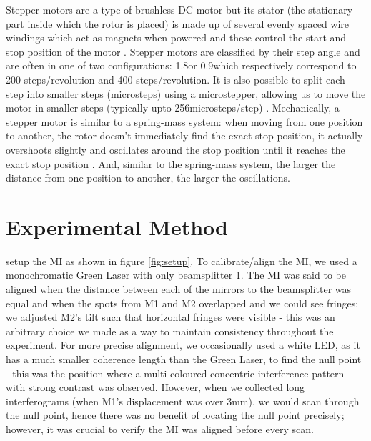 \documentclass[journal]{Imperial_lab_report}
\begin{document}
Stepper motors are a type of brushless DC motor but its stator (the stationary part inside which the rotor is placed) is made up of several evenly spaced wire windings which act as magnets when powered and these control the start and stop position of the motor \cite{motor_diff}. Stepper motors are classified by their step angle and are often in one of two configurations: 1.8\degree or 0.9\degree which respectively correspond to 200 steps/revolution and 400 steps/revolution. It is also possible to split each step into smaller steps (microsteps) using a microstepper, allowing us to move the motor in smaller steps (typically upto 256microsteps/step) \cite{microstepping}. Mechanically, a stepper motor is similar to a spring-mass system: when moving from one position to another, the rotor doesn't immediately find the exact stop position, it actually overshoots slightly and oscillates around the stop position until it reaches the exact stop position \cite{microsteppers_mech_rel}. And, similar to the spring-mass system, the larger the distance from one position to another, the larger the oscillations.
\vspace{-5pt}



\section{Experimental Method}
 setup the MI as shown in figure \ref{fig:setup}. To calibrate/align the MI, we used a monochromatic Green Laser with only beamsplitter 1. The MI was said to be aligned when the distance between each of the mirrors to the beamsplitter was equal and when the spots from M1 and M2 overlapped and we could see fringes; we adjusted M2's tilt such that horizontal fringes were visible - this was an arbitrary choice we made as a way to maintain consistency throughout the experiment. For more precise alignment, we occasionally used a white LED, as it has a much smaller coherence length than the Green Laser, to find the null point - this was the position where a multi-coloured concentric interference pattern with strong contrast was observed. However, when we collected long interferograms (when M1's displacement was over 3mm), we would scan through the null point, hence there was no benefit of locating the null point precisely; however, it was crucial to verify the MI was aligned before every scan.
\end{document}
